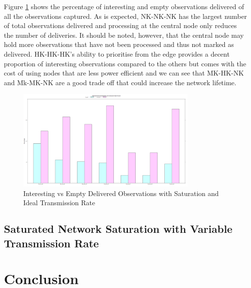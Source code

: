 	Figure \ref{fig:sim:res:saturated:ideal:intempt} shows the percentage of interesting and empty observations delivered of all the observations captured. As is expected, NK-NK-NK has the largest number of total observations delivered and processing at the central node only reduces the number of deliveries. It should be noted, however, that the central node may hold more observations that have not been processed and thus not marked as delivered. HK-HK-HK's ability to prioritise from the edge provides a decent proportion of interesting observations compared to the others but comes with the cost of using nodes that are less power efficient and we can see that MK-HK-NK and Mk-MK-NK are a good trade off that could increase the network lifetime.

	\begin{figure}[h]
	\centering
	\includegraphics[width=0.8\textwidth]{Chap7/figures/plots/saturated_ideal/intdelvemptdel_percent.png}
	\caption{Interesting vs Empty Delivered Observations with Saturation and Ideal Transmission Rate}
	\label{fig:sim:res:saturated:ideal:intempt}
	\end{figure}

\subsection{Saturated Network Saturation with Variable Transmission Rate}


\section{Conclusion} \label{sim:conc}
	







































